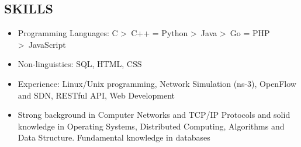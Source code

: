 \documentclass[line]{res}
\begin{document}
\begin{resume}
	\section{SKILLS}
	\begin{itemize}
		\item Programming Languages: C \textgreater \ C++ = Python \textgreater \ Java \textgreater \ Go = PHP \textgreater \ JavaScript
		\item Non-linguistics: SQL, HTML, CSS
		\item Experience: Linux/Unix programming, Network Simulation (ns-3), OpenFlow and SDN, RESTful API, Web Development
		\item Strong background in Computer Networks and TCP/IP Protocols and solid knowledge in Operating Systems, Distributed Computing, Algorithms and Data Structure. Fundamental knowledge in databases 
	\end{itemize}


\end{resume}
\end{document}
